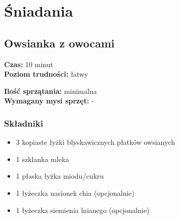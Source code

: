 \documentclass[a4paper,10pt]{book}
\begin{document}
\renewcommand{\contentsname}{Spis treści} 
\tableofcontents
\newpage

\chapter{Śniadania}

\section{Owsianka z owocami}
\bigskip
\small
\begin{minipage}{0.45\textwidth}
    \noindent \textbf{Czas:} 10 minut\\
    \textbf{Poziom trudności:} łatwy 
\end{minipage}
\begin{minipage}{0.45\textwidth}
    \noindent \textbf{Ilość sprzątania:} minimalna\\
    \textbf{Wymagany mysi sprzęt:} -
\end{minipage}
\normalsize
\vspace{0.5cm}

\begin{multicols}{2}

\subsection*{Składniki}
\begin{itemize}
    \item 3 kopiaste łyżki błyskawicznych płatków owsianych
    \item 1 szklanka mleka
    \item 1 płaska łyżka miodu/cukru
    \item 1 łyżeczka nasionek chia (opcjonalnie)
    \item 1 łyżeczka siemienia lnianego (opcjonalnie)
\end{itemize}

\columnbreak

\begin{figure}[H]
    \centering
\end{figure}


\end{multicols}
\end{document}
